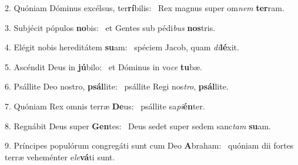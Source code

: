 2. Quóniam Dóminus excélsus, ter\textbf{rí}bilis: \ast\  Rex magnus super om\textit{nem} \textbf{ter}ram.\

3. Subjécit pópulos \textbf{no}bis: \ast\  et Gentes sub pédi\textit{bus} \textbf{nos}tris.\

4. Elégit nobis hereditátem \textbf{su}am: \ast\  spéciem Jacob, quam \textit{di}\textbf{lé}xit.\

5. Ascéndit Deus in \textbf{jú}bilo: \ast\  et Dóminus in vo\textit{ce} \textbf{tu}bæ.\

6. Psállite Deo nostro, \textbf{psál}lite: \ast\  psállite Regi nos\textit{tro}, \textbf{psál}lite.\

7. Quóniam Rex omnis terræ \textbf{De}us: \ast\  psállite sa\textit{pi}\textbf{én}ter.\

8. Regnábit Deus super \textbf{Gen}tes: \ast\  Deus sedet super sedem sanc\textit{tam} \textbf{su}am.\

9. Príncipes populórum congregáti sunt cum Deo \textbf{A}braham: \ast\  quóniam dii fortes terræ veheménter e\textit{le}\textbf{vá}ti sunt.\

